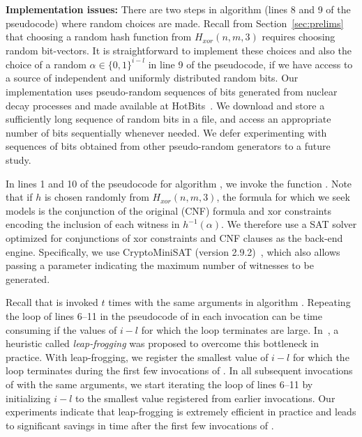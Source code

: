 \noindent 
{\bfseries Implementation issues:} There are two steps in
algorithm {\ApproxMCCore} (lines 8 and 9 of the pseudocode) where
random choices are made.  Recall from
Section~\ref{sec:prelims} that choosing a random hash
function from $H_{xor}(n, m, 3)$ requires choosing random
bit-vectors.  It is straightforward to implement these
choices and also the choice of a random $\alpha \in \{0, 1\}^{i-l}$ 
in line 9 of the pseudocode, if we have access to
a source of independent and uniformly distributed random bits.  
%
%
%
%
%
%
Our implementation uses pseudo-random sequences of bits generated from
nuclear decay processes and made available at HotBits~\cite{HotBits}.
We download and store a sufficiently long sequence of random bits in a
file, and access an appropriate number of bits sequentially whenever
needed. We defer experimenting with sequences of bits obtained from
other pseudo-random generators to a future study.

In lines 1 and 10 of the pseudocode for algorithm {\ApproxMCCore}, we
invoke the function {\BoundedSAT}.  Note that if $h$ is chosen
randomly from $H_{xor}(n, m, 3)$, the formula for which we seek models
is the conjunction of the original (CNF) formula and xor constraints
encoding the inclusion of each witness in $h^{-1}(\alpha)$.  We
therefore use a SAT solver optimized for conjunctions of xor
constraints and CNF clauses as the back-end engine.  Specifically, we
use CryptoMiniSAT (version 2.9.2)~\cite{CryptoMiniSAT}, which also
allows passing a parameter indicating the maximum number of witnesses
to be generated.

Recall that {\ApproxMCCore} is invoked $t$ times with the same
arguments in algorithm {\ApproxMC}.  Repeating the loop of lines 6--11
in the pseudocode of {\ApproxMCCore} in each invocation can be time
consuming if the values of $i-l$ for which the loop terminates are
large.  In~\cite{SKV13}, a heuristic called \emph{leap-frogging} was
proposed to overcome this bottleneck in practice.  With leap-frogging,
we register the smallest value of $i-l$ for which the loop terminates
during the first few invocations of {\ApproxMCCore}.  In all
subsequent invocations of {\ApproxMCCore} with the same arguments, we
start iterating the loop of lines 6--11 by initializing $i-l$ to the
smallest value registered from earlier invocations.  Our experiments
indicate that leap-frogging is extremely efficient in practice and
leads to significant savings in time after the first few invocations
of {\ApproxMCCore}. 
